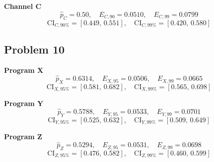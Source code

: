 	\textbf{Channel C}
	\[
	\hat p_C=0.50,\quad E_{C,90}=0.0510,\quad E_{C,99}=0.0799
	\]
	\[
	\text{CI}_{C,90\%}=[0.449,\,0.551],\quad \text{CI}_{C,99\%}=[0.420,\,0.580]
	\]
	
	\subsection*{Problem 10}
	\textbf{Program X}
	\[
	\hat p_X=0.6314,\quad E_{X,95}=0.0506,\quad E_{X,99}=0.0665
	\]
	\[
	\text{CI}_{X,95\%}=[0.581,\,0.682],\quad \text{CI}_{X,99\%}=[0.565,\,0.698]
	\]
	
	\textbf{Program Y}
	\[
	\hat p_Y=0.5788,\quad E_{Y,95}=0.0533,\quad E_{Y,99}=0.0701
	\]
	\[
	\text{CI}_{Y,95\%}=[0.525,\,0.632],\quad \text{CI}_{Y,99\%}=[0.509,\,0.649]
	\]
	
	\textbf{Program Z}
	\[
	\hat p_Z=0.5294,\quad E_{Z,95}=0.0531,\quad E_{Z,99}=0.0698
	\]
	\[
	\text{CI}_{Z,95\%}=[0.476,\,0.582],\quad \text{CI}_{Z,99\%}=[0.460,\,0.599]
	\]
	

